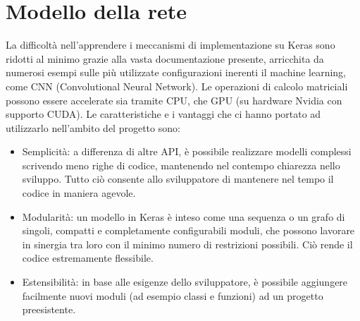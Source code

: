 \section{Modello della rete}
La difficoltà nell’apprendere i meccanismi di implementazione su Keras sono ridotti al minimo grazie alla vasta documentazione presente, arricchita da numerosi esempi sulle più utilizzate configurazioni inerenti il machine learning, come CNN (Convolutional Neural Network).
Le operazioni di calcolo matriciali possono essere accelerate sia tramite CPU, che GPU (su hardware Nvidia con supporto CUDA).
Le caratteristiche e i vantaggi che ci hanno portato ad utilizzarlo nell’ambito del progetto sono:
\begin{itemize}
	\item Semplicità: a differenza di altre API, è possibile realizzare modelli complessi scrivendo meno righe di codice, mantenendo nel contempo chiarezza nello sviluppo. Tutto ciò consente allo sviluppatore di mantenere nel tempo il codice in maniera agevole.
	\item Modularità: un modello in Keras è inteso come una sequenza o un grafo di singoli, compatti e completamente configurabili moduli, che possono lavorare in sinergia tra loro con il minimo numero di restrizioni possibili. Ciò rende il codice estremamente flessibile.
	\item Estensibilità: in base alle esigenze dello sviluppatore, è possibile aggiungere facilmente nuovi moduli (ad esempio classi e funzioni) ad un progetto preesistente.
\end{itemize}
